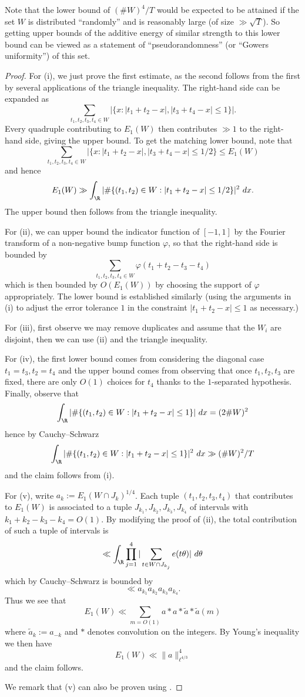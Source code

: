 Note that the lower bound of $(\# W)^4 / T$ would be expected to be attained if the set $W$ is distributed ``randomly'' and is reasonably large (of size $\gg \sqrt{T}$).  So  getting upper bounds of the additive energy of similar strength to this lower bound can be viewed as a statement of ``pseudorandomness'' (or ``Gowers uniformity'') of this set.

\begin{proof} For (i), we just prove the first estimate, as the second follows from the first by several applications of the triangle inequality.  The right-hand side can be expanded as
    $$ \sum_{t_1,t_2,t_3,t_4 \in W} |\{ x: |t_1+t_2-x|, |t_3+t_4-x| \leq 1 \}|.$$
Every quadruple contributing to $E_1(W)$ then contributes $\gg 1$ to the right-hand side, giving the upper bound.  To get the matching lower bound, note that
$$ \sum_{t_1,t_2,t_3,t_4 \in W} |\{ x: |t_1+t_2-x|, |t_3+t_4-x| \leq 1/2 \} \leq E_1(W)$$
and hence
$$ E_1(W) \gg \int_\R |\# \{ (t_1,t_2) \in W: |t_1+t_2 - x| \leq 1/2\} |^2\ dx.$$
The upper bound then follows from the triangle inequality.

For (ii), we can upper bound the indicator function of $[-1,1]$ by the Fourier transform of a non-negative bump function $\varphi$, so that the right-hand side is bounded by
$$ \sum_{t_1,t_2,t_3,t_4 \in W} \varphi(t_1+t_2-t_3-t_4)$$
which is then bounded by $O(E_1(W))$ by choosing the support of $\varphi$ appropriately.  The lower bound is established similarly (using the arguments in (i) to adjust the error tolerance $1$ in the constraint $ |t_1+t_2 - x| \leq 1$ as necessary.)

For (iii), first observe we may remove duplicates and assume that the $W_i$ are disjoint, then we can use (ii) and the triangle inequality.

For (iv), the first lower bound comes from considering the diagonal case $t_1=t_3, t_2 = t_4$ and the upper bound comes from observing that once $t_1,t_2,t_3$ are fixed, there are only $O(1)$ choices for $t_4$ thanks to the $1$-separated hypothesis.  Finally, observe that
$$ \int_\R |\# \{ (t_1,t_2) \in W: |t_1+t_2 - x| \leq 1\} |\ dx = (2 \# W)^2$$
hence by Cauchy--Schwarz
$$ \int_\R |\# \{ (t_1,t_2) \in W: |t_1+t_2 - x| \leq 1\} |^2\ dx \gg (\# W)^2/T$$
and the claim follows from (i).

For (v), write $a_k := E_1(W \cap J_k)^{1/4}$.  Each tuple $(t_1,t_2,t_3,t_4)$ that contributes to $E_1(W)$ is associated to a tuple $J_{k_1}, J_{k_2}, J_{k_3}, J_{k_4}$ of intervals with $k_1+k_2-k_3-k_4=O(1)$.  By modifying the proof of (ii), the total contribution of such a tuple of intervals is
$$ \ll \int_\R \prod_{j=1}^4 |\sum_{t \in W \cap J_{k_j}} e(t\theta)|\ d\theta$$
which by Cauchy--Schwarz is bounded by
$$ \ll a_{k_1} a_{k_2} a_{k_3} a_{k_4}.$$
Thus we see that
$$ E_1(W) \ll \sum_{m=O(1)} a * a * \tilde a * \tilde a(m)$$
where $\tilde a_k := a_{-k}$ and $*$ denotes convolution on the integers.  By Young's inequality we then have
$$ E_1(W) \ll \|a\|_{\ell^{4/3}}^4$$
and the claim follows.

We remark that (v) can also be proven using \cite[Lemma 4.8, (4.2)]{cladek-tao}.
\end{proof}

